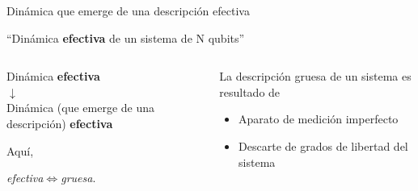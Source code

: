 

\begin{frame}{Dinámica que emerge de una descripción efectiva}
    \begin{center}
        ``Dinámica \textbf{efectiva} de un sistema de N qubits''
    \end{center}
    \pause
    \begin{columns}
        \begin{column}{0.5\textwidth}
            \begin{center}
                Dinámica \textbf{efectiva}\\
                \pause
                $\downarrow$\\
                Dinámica {\tiny(que emerge de una descripción)} \textbf{efectiva}
            \end{center}
            \pause
            Aquí, 
            \begin{center}
                \textit{efectiva}$\iff$\textit{gruesa}.
            \end{center}
        \end{column}
        \pause
        \begin{column}{0.5\textwidth}
            La descripción gruesa de un sistema es resultado de
            \begin{itemize}
                \item Aparato de medición imperfecto
                \item Descarte de grados de libertad del sistema
            \end{itemize}
        \end{column}
    \end{columns}
\end{frame}
